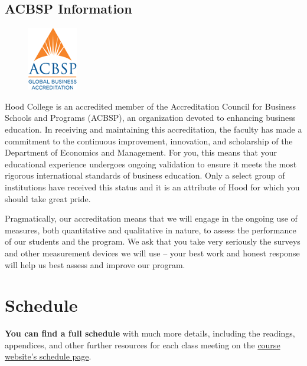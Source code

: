 \documentclass{article}
\begin{document}
\hypertarget{acbsp-information}{%
\subsection*{ACBSP Information}\label{acbsp-information}}

\begin{figure}[h!]
\centering
\includegraphics[]{../images/acbsp.png}
\end{figure}

Hood College is an accredited member of the Accreditation Council for
Business Schools and Programs (ACBSP), an organization devoted to
enhancing business education. In receiving and maintaining this
accreditation, the faculty has made a commitment to the continuous
improvement, innovation, and scholarship of the Department of Economics
and Management. For you, this means that your educational experience
undergoes ongoing validation to ensure it meets the most rigorous
international standards of business education. Only a select group of
institutions have received this status and it is an attribute of Hood
for which you should take great pride.

Pragmatically, our accreditation means that we will engage in the
ongoing use of measures, both quantitative and qualitative in nature, to
assess the performance of our students and the program. We ask that you
take very seriously the surveys and other measurement devices we will
use -- your best work and honest response will help us best assess and
improve our program.

\hypertarget{schedule}{%
\section*{Schedule}\label{schedule}}

\textbf{You can find a full schedule} with much more details, including
the readings, appendices, and other further resources for each class
meeting on the
\href{http://springS21.classes.ryansafner.com/schedule/}{course
website's schedule page}.
\end{document}
